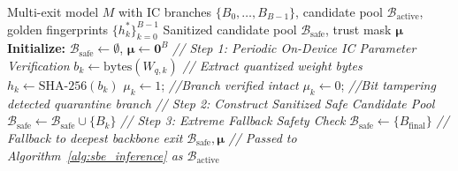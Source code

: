 \documentclass[conference,10pt]{IEEEtran}
\begin{document}
\begin{algorithm}[tb!]
\caption{Phase 2: Intra-Model IC Checksum Verification and Quarantine}
\label{alg:checksum_quarantine}
\begin{algorithmic}[1]
\renewcommand{\algorithmicrequire}{\textbf{Input:}}
\renewcommand{\algorithmicensure}{\textbf{Output:}}
\REQUIRE Multi-exit model $M$ with IC branches $\{B_0, \dots, B_{B-1}\}$, candidate pool $\mathcal{B}_{\text{active}}$, golden fingerprints $\{h_k^*\}_{k=0}^{B-1}$
\ENSURE Sanitized candidate pool $\mathcal{B}_{\text{safe}}$, trust mask $\boldsymbol{\mu}$
\STATE \textbf{Initialize:} $\mathcal{B}_{\text{safe}} \leftarrow \emptyset$, $\boldsymbol{\mu} \leftarrow \mathbf{0}^B$
\STATE \textit{// Step 1: Periodic On-Device IC Parameter Verification}
    \STATE $b_k \leftarrow \text{bytes}(W_{q, k})$ \quad \textit{// Extract quantized weight bytes}
    \STATE $h_k \leftarrow \text{SHA-256}(b_k)$
        \STATE $\mu_k \leftarrow 1$; \textit{//Branch verified intact}
    \ELSE
        \STATE $\mu_k \leftarrow 0$; \textit{//Bit tampering detected quarantine branch}
    \ENDIF
\ENDFOR
\STATE \textit{// Step 2: Construct Sanitized Safe Candidate Pool}
        \STATE $\mathcal{B}_{\text{safe}} \leftarrow \mathcal{B}_{\text{safe}} \cup \{B_k\}$
    \ENDIF
\ENDFOR
\STATE \textit{// Step 3: Extreme Fallback Safety Check}
    \STATE $\mathcal{B}_{\text{safe}} \leftarrow \{B_{\text{final}}\}$ \quad \textit{// Fallback to deepest backbone exit}
\ENDIF
\RETURN $\mathcal{B}_{\text{safe}}, \boldsymbol{\mu}$ \quad \textit{// Passed to Algorithm~\ref{alg:sbe_inference} as $\mathcal{B}_{\text{active}}$}
\end{algorithmic}
\end{algorithm}
\end{document}
